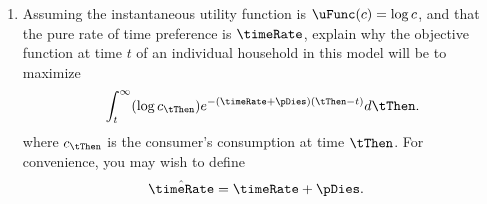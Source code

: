 \documentclass{handout}
\begin{document}
\begin{enumerate}
\item Assuming the instantaneous utility function is $\uFunc(c) = 
\log c$, and that the pure rate of time preference is $\timeRate$, 
explain why the objective function at time $t$ of an individual 
household in this model will be to maximize
\begin{displaymath}
        \int_{t}^{\infty} (\log c_{\tThen}) e^{-(\timeRate+\pDies)(\tThen-t)} d\tThen. \label{eq:objfunc}
\end{displaymath}
where $c_{\tThen}$ is the consumer's consumption at time $\tThen$.  For convenience,
you may wish to define
\begin{equation}\begin{gathered}\begin{aligned}
        \hat{\timeRate} & =  \timeRate+\pDies. \label{eq:thetahat}
\end{aligned}\end{gathered}\end{equation}

\end{enumerate}
\end{document}
